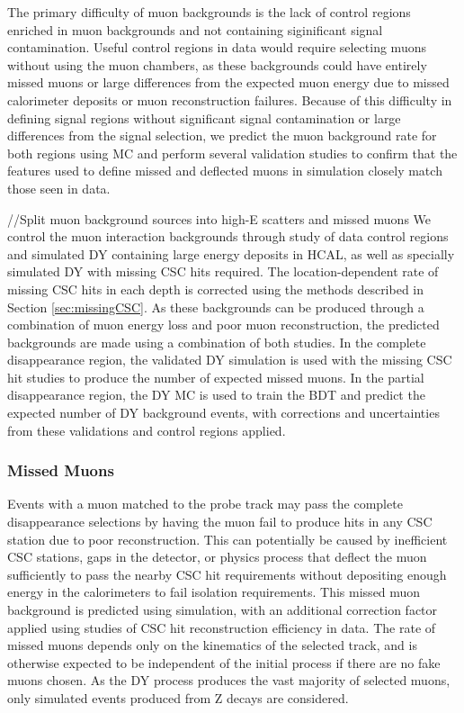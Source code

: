 The primary difficulty of muon backgrounds is the lack of control regions enriched in muon backgrounds and not containing siginificant signal contamination.
Useful control regions in data would require selecting muons without using the muon chambers, as these backgrounds could have entirely missed muons or large differences from the expected muon energy due to missed calorimeter deposits or muon reconstruction failures.
Because of this difficulty in defining signal regions without significant signal contamination or large differences from the signal selection, we predict the muon background rate for both regions using MC and perform several validation studies to confirm that the features used to define missed and deflected muons in simulation closely match those seen in data.

//Split muon background sources into high-E scatters and missed muons
We control the muon interaction backgrounds through study of data control regions and simulated DY containing large energy deposits in HCAL, as well as specially simulated DY with missing CSC hits required. The location-dependent rate of missing CSC hits in each depth is corrected using the methods described in Section \ref{sec:missingCSC}.
As these backgrounds can be produced through a combination of muon energy loss and poor muon reconstruction, the predicted backgrounds are made using a combination of both studies. In the complete disappearance region, the validated DY simulation is used with the missing CSC hit studies to produce the number of expected missed muons. In the partial disappearance region, the DY MC is used to train the BDT and predict the expected number of DY background events, with corrections and uncertainties from these validations and control regions applied.
\subsubsection{Missed Muons}

Events with a muon matched to the probe track may pass the complete disappearance selections by having the muon fail to produce hits in any CSC station due to poor reconstruction. This can potentially be caused by inefficient CSC stations, gaps in the detector, or physics process that deflect the muon sufficiently to pass the nearby CSC hit requirements without depositing enough energy in the calorimeters to fail isolation requirements. This missed muon background is predicted using simulation, with an additional correction factor applied using studies of CSC hit reconstruction efficiency in data. The rate of missed muons depends only on the kinematics of the selected track, and is otherwise expected to be independent of the initial process if there are no fake muons chosen. As the DY process produces the vast majority of selected muons, only simulated events produced from Z decays are considered.

